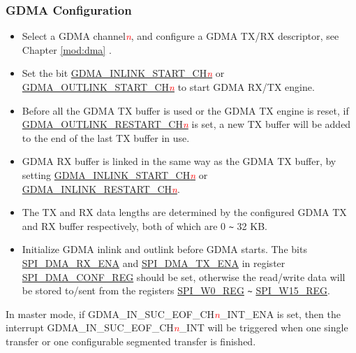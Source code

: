 \documentclass[main\_\_EN.tex]{subfiles}
\begin{document}
\subsubsection{GDMA Configuration}\label{sec:spi-dma-config}


\begin{itemize}
    \item Select a GDMA channel\textcolor{red}{\it{n}}, and configure a GDMA TX/RX descriptor, see Chapter \ref{mod:dma} \textit{}.

    \item Set the bit \hyperref[fielddesc:GDMAINLINKSTARTCHN]{GDMA\_INLINK\_START\_CH\textcolor{red}{\it{n}}} or \hyperref[fielddesc:GDMAOUTLINKSTARTCHN]{GDMA\_OUTLINK\_START\_CH\textcolor{red}{\it{n}}} to start GDMA RX/TX engine.

    \item Before all the GDMA TX buffer is used or the GDMA TX engine is reset, if  \hyperref[fielddesc:GDMAOUTLINKRESTARTCHN]{GDMA\_OUTLINK\_RESTART\_CH\textcolor{red}{\it{n}}} is set, a new TX buffer will be added to the end of the last TX buffer in use.

    \item GDMA RX buffer is linked in the same way as the GDMA TX buffer, by setting \hyperref[fielddesc:GDMAINLINKSTARTCHN]{GDMA\_INLINK\_START\_CH\textcolor{red}{\it{n}}} or \hyperref[fielddesc:GDMAINLINKRESTARTCHN]{GDMA\_INLINK\_RESTART\_CH\textcolor{red}{\it{n}}}.

    \item The TX and RX data lengths are determined by the configured GDMA TX and RX buffer respectively, both of which are 0 \verb+~+ 32 KB.

    \item Initialize GDMA inlink and outlink before GDMA starts. The bits \hyperref[fielddesc:SPIDMARXENA]{SPI\_DMA\_RX\_ENA} and \hyperref[fielddesc:SPIDMATXENA]{SPI\_DMA\_TX\_ENA} in register \hyperref[regdesc:SPIDMACONFREG]{SPI\_DMA\_CONF\_REG} should be set, otherwise the read/write data will be stored to/sent from the registers \hyperref[regdesc:SPIW0REG]{SPI\_W0\_REG} \verb+~+ \hyperref[regdesc:SPIW15REG]{SPI\_W15\_REG}.

\end{itemize}

In master mode, if GDMA\_IN\_SUC\_EOF\_CH\textcolor{red}{\it{n}}\_INT\_ENA is set, then the interrupt GDMA\_IN\_SUC\_EOF\_CH\textcolor{red}{\it{n}}\_INT will be triggered when one single transfer or one configurable segmented transfer is finished.
\end{document}
